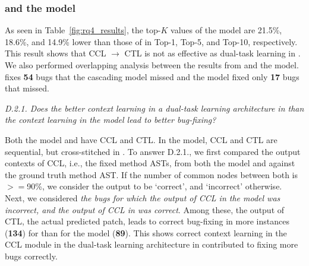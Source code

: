 

\subsubsection{{\bf {\tool} and the  model}}
\label{ccl:sec}

As seen in Table~\ref{fig:rq4_results}, the top-$K$ values of the
 model are 21.5\%, 18.6\%, and 14.9\% lower than those
of {\tool} in Top-1, Top-5, and Top-10, respectively. This result
shows that CCL $\rightarrow$ CTL is not as effective as dual-task
learning in {\tool}.
%
%
We also performed overlapping analysis between the results from
{\tool} and the  model. {\tool} fixes {\bf 54} bugs
that the cascading model missed and the  model fixed
only {\bf 17} bugs that {\tool} missed.

{\em D.2.1. Does the better context learning in a dual-task learning
  architecture in {\tool} than the context learning in the
   model lead to better bug-fixing?}

Both the  model and {\tool} have CCL and CTL. In the
 model, CCL and CTL are sequential, but cross-stitched
in {\tool}. To answer D.2.1., we first compared the output contexts of
CCL, i.e., the fixed method ASTs, from both the  model
and {\tool} against the ground truth method AST. If the number of
common nodes between both is$>=$90\%, we consider the output to be
`correct', and `incorrect' otherwise. Next, we considered {\em the
  bugs for which the output of CCL in the  model was
  incorrect, and the output of CCL in {\tool} was correct}. Among
these, the output of CTL, the actual predicted patch, leads to correct
bug-fixing in more instances ({\bf 134}) for {\tool} than for the
 model ({\bf 89}). This shows correct context learning
in the CCL module in the dual-task learning architecture in {\tool}
contributed to fixing more bugs correctly.

